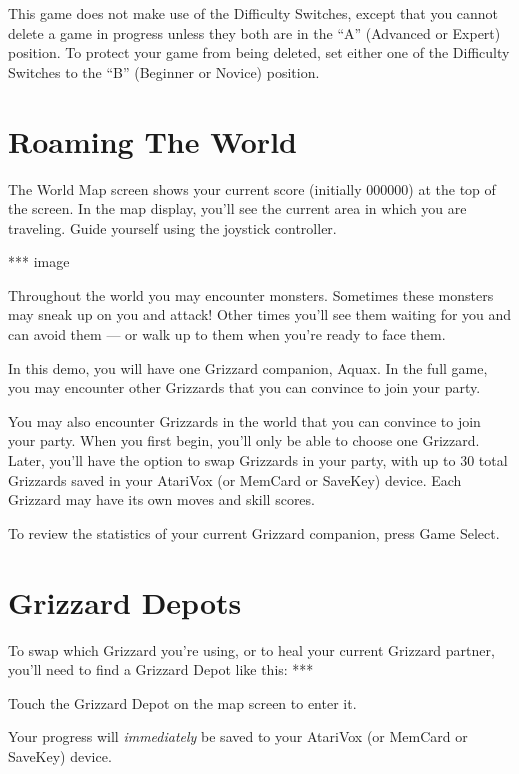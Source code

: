 \documentclass[12pt,twoside,openright,book]{memoir}
\begin{document}
This game does not make use  of the Difficulty Switches, except that you
cannot  delete a  game in  progress unless  they both  are in  the ``A''
(Advanced or Expert) position. To  protect your game from being deleted,
set either  one of  the Difficulty  Switches to  the ``B''  (Beginner or
Novice) position.

\fi

\section{Roaming The World}

\ifdef\TVNTSC
\else
The World Map screen shows your  current score (initially 000000) at the
top of the screen.
\fi
In the map display, you'll see the current area in which you
are traveling. Guide yourself using the joystick controller.

*** image

Throughout  the  world  you  may  encounter  monsters.  Sometimes  these
monsters may  sneak up on  you and attack!  Other times you'll  see them
waiting for you  and can avoid them  --- or walk up to  them when you're
ready to face them.

\ifdef\DEMO
In this demo,  you will have one Grizzard companion,  Aquax. In the full
game, you  may encounter other Grizzards  that you can convince  to join
your party.

\else

You may also  encounter Grizzards in the world that  you can convince to
join your party. When you first begin, you'll only be able to choose one
Grizzard. Later, you'll have the option to swap Grizzards in your party,
with up  to 30  total Grizzards  saved in your  AtariVox (or  MemCard or
SaveKey) device. Each Grizzard may have its own moves and skill scores.

\fi

To  review the  statistics  of your  current  Grizzard companion,  press
Game Select.

\section{Grizzard Depots}

To \ifdef\DEMO\else  swap which  Grizzard you're using,  or to  \fi heal
your current Grizzard partner, you'll need to find a Grizzard Depot like
this: ***

Touch the Grizzard Depot on the map screen to enter it.

Your  progress will  \emph{immediately} be  saved to  your AtariVox  (or
MemCard or SaveKey) device.
\end{document}
